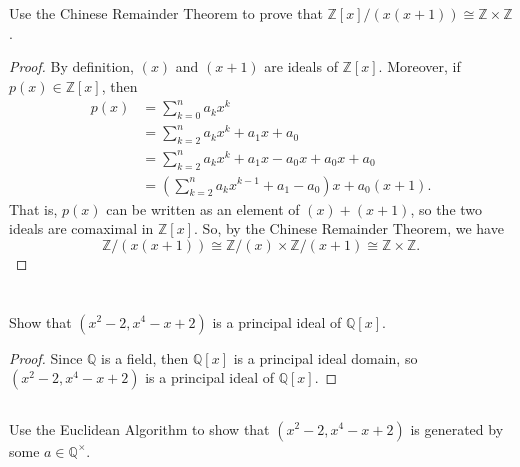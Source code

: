 \documentclass[12pt]{article}
\newenvironment{pbox}{\begin{lrbox}{\mybox}\begin{minipage}{0.98\textwidth}}{\end{minipage}\end{lrbox}\begin{center}\framebox[\textwidth]{\usebox{\mybox}}\end{center}}
\theoremstyle{definition}
\newcommand{\Z}{\mathbb{Z}}
\newcommand{\Q}{\mathbb{Q}}
\newcommand{\isom}{\cong}
\begin{document}
\section{}
\begin{pbox}
    Use the Chinese Remainder Theorem to prove that $\Z[x] / (x(x+1)) \isom \Z \times \Z$.
\end{pbox}

\begin{proof}
    By definition, $(x)$ and $(x + 1)$ are ideals of $\Z[x]$. Moreover, if $p(x) \in \Z[x]$, then
    \begin{align*}
        p(x)
            &= \sum_{k=0}^n a_k x^k \\
            &= \sum_{k=2}^n a_k x^k + a_1x + a_0 \\
            &= \sum_{k=2}^n a_k x^k + a_1x - a_0x + a_0x + a_0 \\
            &= \left(\sum_{k=2}^n a_k x^{k-1} + a_1 - a_0\right) x + a_0(x + 1).
    \end{align*}
    That is, $p(x)$ can be written as an element of $(x) + (x + 1)$, so the two ideals are comaximal in $\Z[x]$. So, by the Chinese Remainder Theorem, we have
    \[
        \Z/(x(x+1)) \isom \Z/(x) \times \Z/(x + 1) \isom \Z \times \Z.
    \]
    
\end{proof}

\newpage
\section{}
\subsection{}
\begin{pbox}
    Show that $(x^2 - 2, x^4 - x + 2)$ is a principal ideal of $\Q[x]$.
\end{pbox}

\begin{proof}
    Since $\Q$ is a field, then $\Q[x]$ is a principal ideal domain, so $(x^2 - 2, x^4 - x + 2)$ is a principal ideal of $\Q[x]$.
    
\end{proof}

\subsection{}
\begin{pbox}
    Use the Euclidean Algorithm to show that $(x^2 - 2, x^4 - x + 2)$ is generated by some $a \in \Q^\times$.
\end{pbox}
\end{document}
